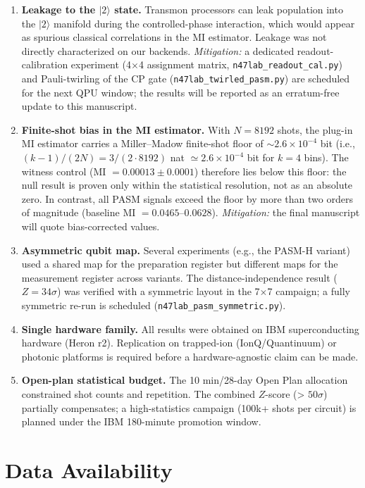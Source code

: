 \documentclass[12pt,a4paper]{article}
\begin{document}
\begin{enumerate}
    \item \textbf{Leakage to the $|2\rangle$ state.} Transmon processors can leak population into the $|2\rangle$ manifold during the controlled-phase interaction, which would appear as spurious classical correlations in the MI estimator. Leakage was not directly characterized on our backends. \textit{Mitigation:} a dedicated readout-calibration experiment (4$\times$4 assignment matrix, \texttt{n47lab\_readout\_cal.py}) and Pauli-twirling of the CP gate (\texttt{n47lab\_twirled\_pasm.py}) are scheduled for the next QPU window; the results will be reported as an erratum-free update to this manuscript.
    \item \textbf{Finite-shot bias in the MI estimator.} With $N=8192$ shots, the plug-in MI estimator carries a Miller--Madow finite-shot floor of $\sim 2.6\times10^{-4}$ bit (i.e., $(k-1)/(2N) = 3/(2\cdot 8192)$ nat $\simeq 2.6\times10^{-4}$ bit for $k=4$ bins). The witness control (MI $= 0.00013 \pm 0.0001$) therefore lies below this floor: the null result is proven only within the statistical resolution, not as an absolute zero. In contrast, all PASM signals exceed the floor by more than two orders of magnitude (baseline MI $= 0.0465$--$0.0628$). \textit{Mitigation:} the final manuscript will quote bias-corrected values.
    \item \textbf{Asymmetric qubit map.} Several experiments (e.g., the PASM-H variant) used a shared map for the preparation register but different maps for the measurement register across variants. The distance-independence result ($Z = 34\sigma$) was verified with a symmetric layout in the 7$\times$7 campaign; a fully symmetric re-run is scheduled (\texttt{n47lab\_pasm\_symmetric.py}).
    \item \textbf{Single hardware family.} All results were obtained on IBM superconducting hardware (Heron r2). Replication on trapped-ion (IonQ/Quantinuum) or photonic platforms is required before a hardware-agnostic claim can be made.
    \item \textbf{Open-plan statistical budget.} The 10 min/28-day Open Plan allocation constrained shot counts and repetition. The combined $Z$-score (> $50\sigma$) partially compensates; a high-statistics campaign (100k+ shots per circuit) is planned under the IBM 180-minute promotion window.
\end{enumerate}

\section*{Data Availability}
\end{document}
